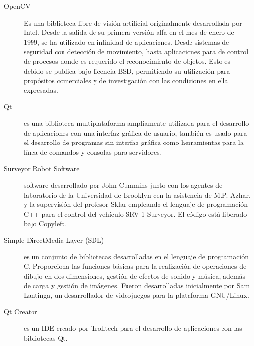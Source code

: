 \documentclass[a4paper,12pt]{article}
\begin{document}
\begin{description} 

\item [OpenCV]
Es una biblioteca libre de visión artificial originalmente desarrollada por Intel. Desde la salida de su primera versión alfa en el mes de enero de 1999, se ha utilizado en infinidad de aplicaciones. Desde sistemas de seguridad con detección de movimiento, hasta aplicaciones para de control de procesos donde es requerido el reconocimiento de objetos. Esto es debido se publica bajo licencia BSD, permitiendo su utilización para propósitos comerciales y de investigación con las condiciones en ella expresadas.

\item [Qt] es una biblioteca multiplataforma ampliamente utilizada para el desarrollo de aplicaciones con una interfaz gráfica de usuario, también es usado para el desarrollo de programas sin interfaz gráfica como herramientas para la línea de comandos y consolas para servidores.

\item [Surveyor Robot Software] software desarrollado por John Cummins junto con los agentes de laboratorio de la Universidad de Brooklyn con la asistencia de M.P. Azhar, y la supervisión del profesor Sklar empleando el lenguaje de programación C++ para el control del vehículo SRV-1 Surveyor. El código está liberado bajo Copyleft.

\item [Simple DirectMedia Layer (SDL)] es un conjunto de bibliotecas desarrolladas en el lenguaje de programación C. Proporciona las funciones básicas para la realización de operaciones de dibujo en dos dimensiones, gestión de efectos de sonido y música, además de carga y gestión de imágenes. Fueron desarrolladas inicialmente por Sam Lantinga, un desarrollador de videojuegos para la plataforma GNU/Linux.

\item [Qt Creator] es un IDE creado por Trolltech para el desarrollo de aplicaciones con las bibliotecas Qt.


\end{description}
\end{document}
